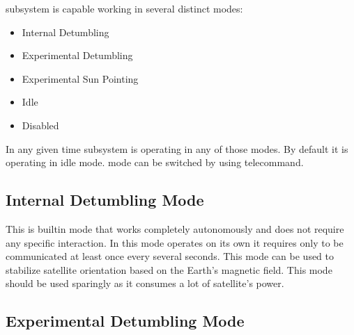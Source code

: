 
\Adcs subsystem is capable working in several distinct modes:

\begin{itemize}
    \item Internal Detumbling
    \item Experimental Detumbling
    \item Experimental Sun Pointing
    \item Idle
    \item Disabled
\end{itemize}

In any given time \Adcs subsystem is operating in any of those modes. By default it
is operating in idle mode. \Adcs mode can be switched by using 
telecommand.

\subsection{Internal Detumbling Mode}

This is \Imtq builtin mode that works completely autonomously and does not 
require any specific interaction. In this mode \Imtq operates on its own 
it requires only to be communicated at least once every several seconds. 
This mode can be used to stabilize satellite orientation based on the 
Earth's magnetic field. This mode should be used sparingly as it consumes 
a lot of satellite's power. 

\subsection{Experimental Detumbling Mode}


